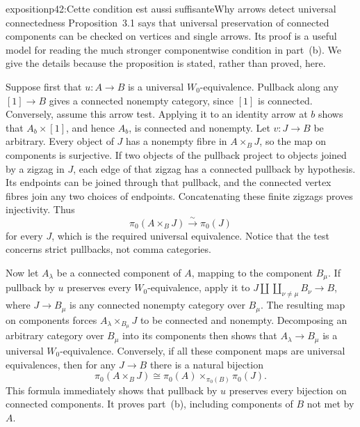 \begin{dcomment}{exposition}{p42:Cette condition est aussi suffisante}{Why arrows detect universal connectedness}
Proposition~3.1 says that universal preservation of connected components can be checked on vertices and single arrows. Its proof is a useful model for reading the much stronger componentwise condition in part~(b). We give the details because the proposition is stated, rather than proved, here.

Suppose first that $u:A\longrightarrow B$ is a universal $W_0$-equivalence. Pullback along any $[1]\longrightarrow B$ gives a connected nonempty category, since $[1]$ is connected. Conversely, assume this arrow test. Applying it to an identity arrow at $b$ shows that $A_b\times[1]$, and hence $A_b$, is connected and nonempty. Let $v:J\longrightarrow B$ be arbitrary. Every object of $J$ has a nonempty fibre in $A\times_BJ$, so the map on components is surjective. If two objects of the pullback project to objects joined by a zigzag in $J$, each edge of that zigzag has a connected pullback by hypothesis. Its endpoints can be joined through that pullback, and the connected vertex fibres join any two choices of endpoints. Concatenating these finite zigzags proves injectivity. Thus
\[
 \pi_0(A\times_BJ)\xrightarrow{\sim}\pi_0(J)
\]
for every $J$, which is the required universal equivalence. Notice that the test concerns strict pullbacks, not comma categories.

Now let $A_\lambda$ be a connected component of $A$, mapping to the component $B_\mu$. If pullback by $u$ preserves every $W_0$-equivalence, apply it to $J\amalg\coprod_{\nu\ne\mu}B_\nu\longrightarrow B$, where $J\longrightarrow B_\mu$ is any connected nonempty category over $B_\mu$. The resulting map on components forces $A_\lambda\times_{B_\mu}J$ to be connected and nonempty. Decomposing an arbitrary category over $B_\mu$ into its components then shows that $A_\lambda\longrightarrow B_\mu$ is a universal $W_0$-equivalence. Conversely, if all these component maps are universal equivalences, then for any $J\longrightarrow B$ there is a natural bijection
\[
 \pi_0(A\times_BJ)\cong
 \pi_0(A)\times_{\pi_0(B)}\pi_0(J).
\]
This formula immediately shows that pullback by $u$ preserves every bijection on connected components. It proves part~(b), including components of $B$ not met by $A$.


\end{dcomment}

